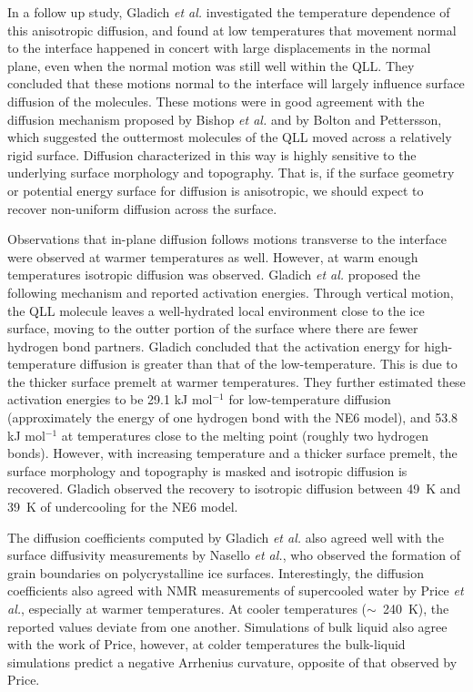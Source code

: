 In a follow up study, Gladich \textit{et al.} investigated the
temperature dependence of this anisotropic diffusion, and found at low
temperatures that movement normal to the interface happened in concert
with large displacements in the normal plane, even when the normal
motion was still well within the QLL.\cite{Gladich2011} They concluded
that these motions normal to the interface will largely influence
surface diffusion of the molecules. These motions were in good
agreement with the diffusion mechanism proposed by Bishop \textit{et
  al.}\cite{Bishop2009} and by Bolton and Pettersson\cite{Bolton2000},
which suggested the outtermost molecules of the QLL moved across a
relatively rigid surface. Diffusion characterized in this way is
highly sensitive to the underlying surface morphology and topography.
That is, if the surface geometry or potential energy surface for
diffusion is anisotropic, we should expect to recover non-uniform
diffusion across the surface.

Observations that in-plane diffusion follows motions transverse to the
interface were observed at warmer temperatures as well. However, at
warm enough temperatures isotropic diffusion was
observed.\cite{Gladich2011,Gladich2015} Gladich \textit{et al.}
proposed the following mechanism and reported activation
energies. Through vertical motion, the QLL molecule leaves a
well-hydrated local environment close to the ice surface, moving to
the outter portion of the surface where there are fewer hydrogen bond
partners. Gladich concluded that the activation energy for
high-temperature diffusion is greater than that of the
low-temperature. This is due to the thicker surface premelt at warmer
temperatures.  They further estimated these activation energies to be
29.1 kJ mol$^{-1}$ for low-temperature diffusion (approximately the
energy of one hydrogen bond with the NE6 model), and 53.8 kJ
mol$^{-1}$ at temperatures close to the melting point (roughly two
hydrogen bonds).  However, with increasing temperature and a thicker
surface premelt, the surface morphology and topography is masked and
isotropic diffusion is recovered. Gladich observed the recovery to
isotropic diffusion between 49~K and 39~K of undercooling for the NE6
model.

The diffusion coefficients computed by Gladich \textit{et al.} also
agreed well with the surface diffusivity measurements by Nasello
\textit{et al.}, who observed the formation of grain boundaries on
polycrystalline ice surfaces.\cite{Nasello2007} Interestingly, the
diffusion coefficients also agreed with NMR measurements of
supercooled water by Price \textit{et al.}, especially at warmer
temperatures. \cite{Price1999} At cooler temperatures ($\sim$~240~K),
the reported values deviate from one another. Simulations of bulk
liquid also agree with the work of Price, however, at colder
temperatures the bulk-liquid simulations predict a negative Arrhenius
curvature, opposite of that observed by
Price.\cite{Picaud2006,Mahoney2001a}


